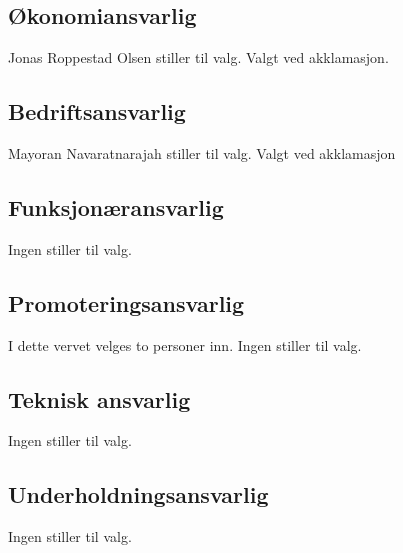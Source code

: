 \documentclass[10pt,norsk,a4paper]{article}
\begin{document}
\subsection{Økonomiansvarlig}
Jonas Roppestad Olsen stiller til valg. 
Valgt ved akklamasjon.

\subsection{Bedriftsansvarlig}
Mayoran Navaratnarajah stiller til valg. 
Valgt ved akklamasjon

\subsection{Funksjonæransvarlig}
Ingen stiller til valg. 

\subsection{Promoteringsansvarlig}
I dette vervet velges to personer inn.
Ingen stiller til valg. 

\subsection{Teknisk ansvarlig}
Ingen stiller til valg. 

\subsection{Underholdningsansvarlig}
Ingen stiller til valg. 

\label{lastpage}
\end{document}
